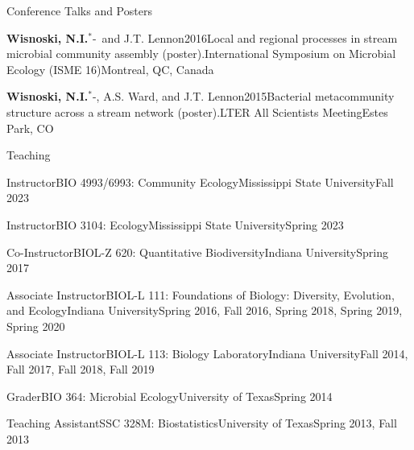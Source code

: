 \documentclass{resume} %
\newcommand{\Star}{\ensuremath{^*}\kern-\scriptspace}
\begin{document}
\begin{rhangSection}{Conference Talks and Posters}
\begin{Presentation}{{\bf Wisnoski, N.I.}\Star\ and J.T. Lennon}{2016}{Local and regional processes in stream microbial community assembly (poster).}{International Symposium on Microbial Ecology (ISME 16)}{Montreal, QC, Canada}
\end{Presentation}

\begin{Presentation}{{\bf Wisnoski, N.I.}\Star, A.S. Ward, and J.T. Lennon}{2015}{Bacterial metacommunity structure across a stream network (poster).}{LTER All Scientists Meeting}{Estes Park, CO}
\end{Presentation}

\end{rhangSection}

\bigskip

\begin{rSection}{Teaching}

\begin{Course}
  {Instructor}{BIO 4993/6993: Community Ecology}{Mississippi State University}{Fall 2023}
\end{Course}

\begin{Course}
  {Instructor}{BIO 3104: Ecology}{Mississippi State University}{Spring 2023}
\end{Course}

\begin{Course}
  {Co-Instructor}{BIOL-Z 620: Quantitative Biodiversity}{Indiana University}{Spring 2017}
\end{Course}

\begin{Course}
  {Associate Instructor}{BIOL-L 111: Foundations of Biology: Diversity, Evolution, and Ecology}{Indiana University}{Spring 2016, Fall 2016, Spring 2018, Spring 2019, Spring 2020}
\end{Course}

\begin{Course}
  {Associate Instructor}{BIOL-L 113: Biology Laboratory}{Indiana University}{Fall 2014, Fall 2017, Fall 2018, Fall 2019}
\end{Course}

\begin{Course}
  {Grader}{BIO 364: Microbial Ecology}{University of Texas}{Spring 2014}
\end{Course}

\begin{Course}
  {Teaching Assistant}{SSC 328M: Biostatistics}{University of Texas}{Spring 2013, Fall 2013}
\end{Course}

\end{rSection}
\end{document}
